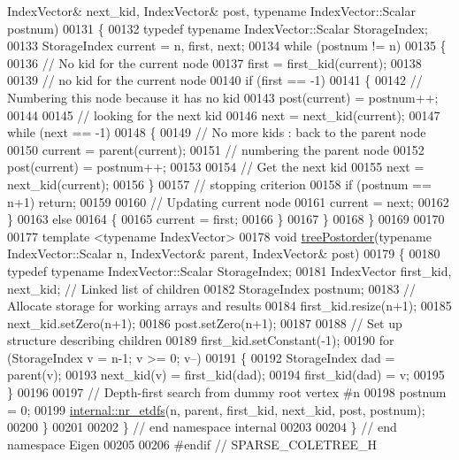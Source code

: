 \begin{DoxyCode}
      IndexVector& next\_kid, IndexVector& post, \textcolor{keyword}{typename} IndexVector::Scalar postnum)
00131 \{
00132   \textcolor{keyword}{typedef} \textcolor{keyword}{typename} IndexVector::Scalar StorageIndex;
00133   StorageIndex current = n, first, next;
00134   \textcolor{keywordflow}{while} (postnum != n) 
00135   \{
00136     \textcolor{comment}{// No kid for the current node}
00137     first = first\_kid(current);
00138     
00139     \textcolor{comment}{// no kid for the current node}
00140     \textcolor{keywordflow}{if} (first == -1) 
00141     \{
00142       \textcolor{comment}{// Numbering this node because it has no kid }
00143       post(current) = postnum++;
00144       
00145       \textcolor{comment}{// looking for the next kid }
00146       next = next\_kid(current); 
00147       \textcolor{keywordflow}{while} (next == -1) 
00148       \{
00149         \textcolor{comment}{// No more kids : back to the parent node}
00150         current = parent(current); 
00151         \textcolor{comment}{// numbering the parent node }
00152         post(current) = postnum++;
00153         
00154         \textcolor{comment}{// Get the next kid }
00155         next = next\_kid(current); 
00156       \}
00157       \textcolor{comment}{// stopping criterion }
00158       \textcolor{keywordflow}{if} (postnum == n+1) \textcolor{keywordflow}{return}; 
00159       
00160       \textcolor{comment}{// Updating current node }
00161       current = next; 
00162     \}
00163     \textcolor{keywordflow}{else} 
00164     \{
00165       current = first; 
00166     \}
00167   \}
00168 \}
00169 
00170 
00177 \textcolor{keyword}{template} <\textcolor{keyword}{typename} IndexVector>
00178 \textcolor{keywordtype}{void} \hyperlink{namespace_eigen_1_1internal_ab414b5990bd6c865958a9231ff418d20}{treePostorder}(\textcolor{keyword}{typename} IndexVector::Scalar n, IndexVector& parent, IndexVector& post)
00179 \{
00180   \textcolor{keyword}{typedef} \textcolor{keyword}{typename} IndexVector::Scalar StorageIndex;
00181   IndexVector first\_kid, next\_kid; \textcolor{comment}{// Linked list of children }
00182   StorageIndex postnum; 
00183   \textcolor{comment}{// Allocate storage for working arrays and results }
00184   first\_kid.resize(n+1); 
00185   next\_kid.setZero(n+1);
00186   post.setZero(n+1);
00187   
00188   \textcolor{comment}{// Set up structure describing children}
00189   first\_kid.setConstant(-1); 
00190   \textcolor{keywordflow}{for} (StorageIndex v = n-1; v >= 0; v--) 
00191   \{
00192     StorageIndex dad = parent(v);
00193     next\_kid(v) = first\_kid(dad); 
00194     first\_kid(dad) = v; 
00195   \}
00196   
00197   \textcolor{comment}{// Depth-first search from dummy root vertex #n}
00198   postnum = 0; 
00199   \hyperlink{namespace_eigen_1_1internal_acbd726e03f667e0dc788c6b4e92d61ec}{internal::nr\_etdfs}(n, parent, first\_kid, next\_kid, post, postnum);
00200 \}
00201 
00202 \} \textcolor{comment}{// end namespace internal}
00203 
00204 \} \textcolor{comment}{// end namespace Eigen}
00205 
00206 \textcolor{preprocessor}{#endif // SPARSE\_COLETREE\_H}
\end{DoxyCode}
